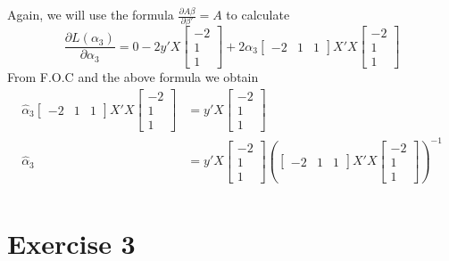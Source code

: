 \documentclass[12pt, a4paper]{article}\usepackage[]{graphicx}\usepackage[]{color}
\begin{document}
Again, we will use the formula $\frac{\partial A\beta}{\partial \beta'} = A$ to calculate 
\[ \frac{\partial L(\alpha_3)}{\partial \alpha_3} = 
  0 - 2 y'X \begin{bmatrix} -2 \\ 1 \\ 1 \end{bmatrix} 
  + 2 \alpha_3 \begin{bmatrix} -2 & 1 & 1 \end{bmatrix} X'X \begin{bmatrix} -2 \\ 1 \\ 1 \end{bmatrix} 
\]
From F.O.C and the above formula we obtain 
\begin{align*}
  \hat{\alpha}_3 \begin{bmatrix} -2 & 1 & 1 \end{bmatrix} X'X \begin{bmatrix} -2 \\ 1 \\ 1 \end{bmatrix} 
  & = y'X \begin{bmatrix} -2 \\ 1 \\ 1 \end{bmatrix} \\
  \hat{\alpha}_3 & =
    y'X \begin{bmatrix} -2 \\ 1 \\ 1 \end{bmatrix} \left(\begin{bmatrix} -2 & 1 & 1 \end{bmatrix} X'X \begin{bmatrix} -2 \\ 1 \\ 1 \end{bmatrix} \right)^{-1}\\
\end{align*}








\section{Exercise 3}
\end{document}
